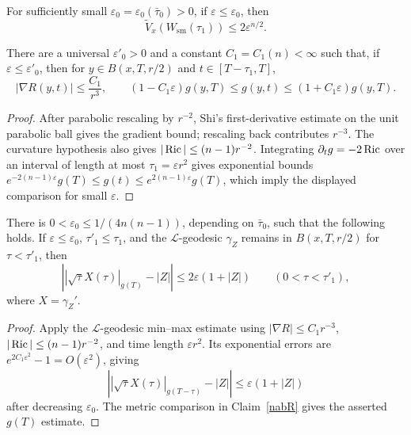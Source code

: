 \begin{corollary}
\label{cor:reduced-volume-small-bound}

For sufficiently small
$\varepsilon_0=\varepsilon_0(\bar\tau_0)>0$, if
$\varepsilon\leq\varepsilon_0$, then
\[
  \widetilde V_x(W_{\mathrm{sm}}(\tau_1))\leq2\varepsilon^{n/2}.
\]
\end{corollary}

\begin{claim}
\label{claim:scalar-curvature-gradient-metric-bound}
\label{nabR}

There are a universal $\varepsilon'_0>0$ and a constant
$C_1=C_1(n)<\infty$ such that, if
$\varepsilon\leq\varepsilon'_0$, then for
$y\in B(x,T,r/2)$ and $t\in[T-\tau_1,T]$,
\[
  |\nabla R(y,t)|\leq\frac{C_1}{r^3},
  \qquad
  (1-C_1\varepsilon)g(y,T)
  \leq g(y,t)\leq
  (1+C_1\varepsilon)g(y,T).
\]
\end{claim}

\begin{proof}
\sketch
{}
After parabolic rescaling by $r^{-2}$, Shi's first-derivative estimate on the
unit parabolic ball gives the gradient bound; rescaling back contributes
$r^{-3}$. The curvature hypothesis also gives
$|\operatorname{Ric}|\leq(n-1)r^{-2}$. Integrating
$\partial_tg=-2\operatorname{Ric}$ over an interval of length at most
$\tau_1=\varepsilon r^2$ gives exponential bounds
$e^{-2(n-1)\varepsilon}g(T)\leq g(t)\leq
e^{2(n-1)\varepsilon}g(T)$, which imply the displayed comparison for small
$\varepsilon$.
\end{proof}

\begin{claim}
\label{claim:l-geodesic-norm-comparison}

There is
$0<\varepsilon_0\leq1/(4n(n-1))$, depending on $\bar\tau_0$, such that the
following holds. If $\varepsilon\leq\varepsilon_0$,
$\tau'_1\leq\tau_1$, and the $\mathcal L$-geodesic $\gamma_Z$ remains in
$B(x,T,r/2)$ for $\tau<\tau'_1$, then
\[
  \left||\sqrt\tau X(\tau)|_{g(T)}-|Z|\right|
  \leq2\varepsilon(1+|Z|)
  \qquad(0<\tau<\tau'_1),
\]
where $X=\gamma_Z'$.
\end{claim}

\begin{proof}
\sketch
{}
Apply the $\mathcal L$-geodesic min--max estimate using
$|\nabla R|\leq C_1r^{-3}$, $|\operatorname{Ric}|\leq(n-1)r^{-2}$, and time length
$\varepsilon r^2$. Its exponential errors are
$e^{2C_1\varepsilon^2}-1=O(\varepsilon^2)$, giving
\[
  \left||\sqrt\tau X(\tau)|_{g(T-\tau)}-|Z|\right|
  \leq\varepsilon(1+|Z|)
\]
after decreasing $\varepsilon_0$. The metric comparison in Claim~\ref{nabR}
gives the asserted $g(T)$ estimate.
\end{proof}

